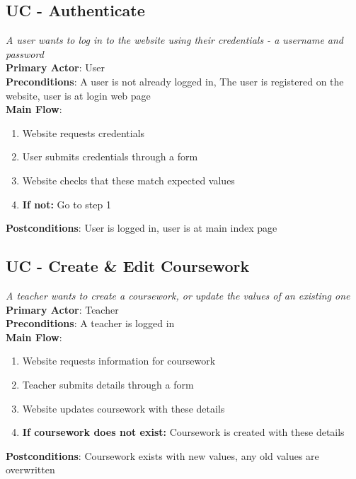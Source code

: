 \documentclass[a4paper,11pt]{report}
\begin{document}
\singlespacing
\subsection*{UC - Authenticate}
\textit{A user wants to log in to the website using their credentials - a username and password}\\
\textbf{Primary Actor}: User\\
\textbf{Preconditions}: A user is not already logged in, The user is registered on the website, user is at login web page\\
\textbf{Main Flow}:
\begin{enumerate}
\item Website requests credentials
\item User submits credentials through a form
\item Website checks that these match expected values
\item \textbf{If not:} Go to step 1
\end{enumerate}
\textbf{Postconditions}: User is logged in, user is at main index page

\subsection*{UC - Create \& Edit Coursework}
\textit{A teacher wants to create a coursework, or update the values of an existing one}\\
\textbf{Primary Actor}: Teacher\\
\textbf{Preconditions}: A teacher is logged in\\
\textbf{Main Flow}:
\begin{enumerate}
\item Website requests information for coursework
\item Teacher submits details through a form
\item Website updates coursework with these details
\item \textbf{If coursework does not exist:} Coursework is created with these details
\end{enumerate}
\textbf{Postconditions}: Coursework exists with new values, any old values are overwritten
\end{document}
